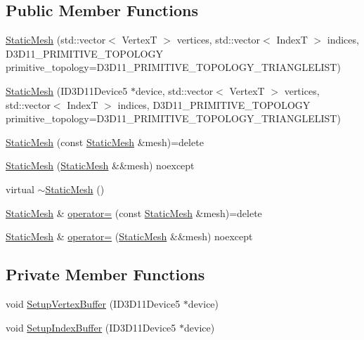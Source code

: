 \subsection*{Public Member Functions}
\begin{DoxyCompactItemize}
\item 
\hyperlink{classmage_1_1_static_mesh_a12e95f33bd56ad37e931fcf4e1679a12}{Static\+Mesh} (std\+::vector$<$ VertexT $>$ vertices, std\+::vector$<$ IndexT $>$ indices, D3\+D11\+\_\+\+P\+R\+I\+M\+I\+T\+I\+V\+E\+\_\+\+T\+O\+P\+O\+L\+O\+GY primitive\+\_\+topology=D3\+D11\+\_\+\+P\+R\+I\+M\+I\+T\+I\+V\+E\+\_\+\+T\+O\+P\+O\+L\+O\+G\+Y\+\_\+\+T\+R\+I\+A\+N\+G\+L\+E\+L\+I\+ST)
\item 
\hyperlink{classmage_1_1_static_mesh_a0178889509a63152cfa756ea2d2c419d}{Static\+Mesh} (I\+D3\+D11\+Device5 $\ast$device, std\+::vector$<$ VertexT $>$ vertices, std\+::vector$<$ IndexT $>$ indices, D3\+D11\+\_\+\+P\+R\+I\+M\+I\+T\+I\+V\+E\+\_\+\+T\+O\+P\+O\+L\+O\+GY primitive\+\_\+topology=D3\+D11\+\_\+\+P\+R\+I\+M\+I\+T\+I\+V\+E\+\_\+\+T\+O\+P\+O\+L\+O\+G\+Y\+\_\+\+T\+R\+I\+A\+N\+G\+L\+E\+L\+I\+ST)
\item 
\hyperlink{classmage_1_1_static_mesh_a67f17b0c2e82e3ea33db92ded91a746f}{Static\+Mesh} (const \hyperlink{classmage_1_1_static_mesh}{Static\+Mesh} \&mesh)=delete
\item 
\hyperlink{classmage_1_1_static_mesh_ae8d097727f50c05d0397828540b1af0c}{Static\+Mesh} (\hyperlink{classmage_1_1_static_mesh}{Static\+Mesh} \&\&mesh) noexcept
\item 
virtual \hyperlink{classmage_1_1_static_mesh_ae14c69f2c93f534a4f48f66c8f2deb79}{$\sim$\+Static\+Mesh} ()
\item 
\hyperlink{classmage_1_1_static_mesh}{Static\+Mesh} \& \hyperlink{classmage_1_1_static_mesh_a00919cc54283e85b94e3f3d97ebe2340}{operator=} (const \hyperlink{classmage_1_1_static_mesh}{Static\+Mesh} \&mesh)=delete
\item 
\hyperlink{classmage_1_1_static_mesh}{Static\+Mesh} \& \hyperlink{classmage_1_1_static_mesh_a12b9f307dc7e7f7567d37fe94a288f85}{operator=} (\hyperlink{classmage_1_1_static_mesh}{Static\+Mesh} \&\&mesh) noexcept
\end{DoxyCompactItemize}
\subsection*{Private Member Functions}
\begin{DoxyCompactItemize}
\item 
void \hyperlink{classmage_1_1_static_mesh_a5e9c8e2a9441ccb41b52938cf05c4034}{Setup\+Vertex\+Buffer} (I\+D3\+D11\+Device5 $\ast$device)
\item 
void \hyperlink{classmage_1_1_static_mesh_af60eb028ed40e4bd6595edbee110bc7d}{Setup\+Index\+Buffer} (I\+D3\+D11\+Device5 $\ast$device)
\end{DoxyCompactItemize}
